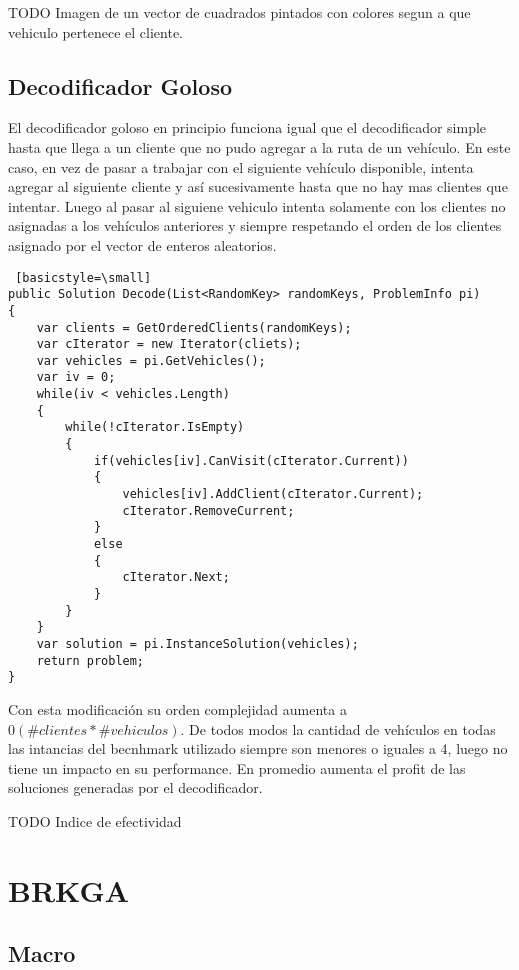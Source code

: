 \bigskip

TODO Imagen de un vector de cuadrados pintados con colores segun a que vehiculo pertenece el cliente.

\subsection{Decodificador Goloso}

El decodificador goloso en principio funciona igual que el decodificador simple hasta que llega a un cliente que no pudo agregar a la ruta de un vehículo. En este caso, en vez de pasar a trabajar con el siguiente vehículo disponible, intenta agregar al siguiente cliente y así sucesivamente hasta que no hay mas clientes que intentar. Luego al pasar al siguiene vehiculo intenta solamente con los clientes no asignadas a los vehículos anteriores y siempre respetando el orden de los clientes asignado por el vector de enteros aleatorios.

\bigskip

\begin{lstlisting} [basicstyle=\small]
public Solution Decode(List<RandomKey> randomKeys, ProblemInfo pi)
{
	var clients = GetOrderedClients(randomKeys);
	var cIterator = new Iterator(cliets);
	var vehicles = pi.GetVehicles();	
	var iv = 0;
	while(iv < vehicles.Length)
	{
		while(!cIterator.IsEmpty)
		{
			if(vehicles[iv].CanVisit(cIterator.Current))
			{
				vehicles[iv].AddClient(cIterator.Current);
				cIterator.RemoveCurrent;
			}
			else
			{
				cIterator.Next;			
			}			
		}
	}
	var solution = pi.InstanceSolution(vehicles);
	return problem;
}
\end{lstlisting}

\bigskip

Con esta modificación su orden complejidad aumenta a $0(\#clientes * \#vehiculos)$. De todos modos la cantidad de vehículos en todas las intancias del becnhmark utilizado siempre son menores o iguales a 4, luego no tiene un impacto en su performance. En promedio aumenta el profit de las soluciones generadas por el decodificador.

\bigskip

TODO Indice de efectividad

\section{BRKGA}

\subsection{Macro}

